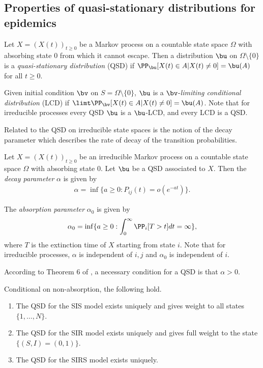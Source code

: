 \documentclass[review]{elsarticle}
\begin{document}
\subsection{Properties of quasi-stationary distributions for epidemics}\label{subsec: qsd}
\begin{mydef}
  Let $X = (X(t))_{t \geq 0}$ be a Markov process on a countable state space $\Omega$ with absorbing state $0$ from which it cannot escape. Then a distribution $\bu$ on $\Omega \setminus \{0\}$ is a \emph{quasi-stationary distribution} (QSD) if $\PP_{\bu}[X(t) \in A | X(t) \neq 0] = \bu(A)$ for all $t \geq 0$.
  
  Given initial condition $\bv$ on $S=\Omega\setminus\{0\}$, $\bu$ is a $\bv$-\emph{limiting conditional distribution} (LCD) if $\limt \PP_{\bv}[X(t) \in A | X(t) \neq 0] = \bu(A)$. Note that for irreducible processes every QSD $\bu$ is a $\bu$-LCD, and every LCD is a QSD.
\end{mydef}

Related to the QSD on irreducible state spaces is the notion of the decay parameter which describes the rate of decay of the transition probabilities.
\begin{mydef}
	Let $X=(X(t))_{t \geq 0}$ be an irreducible Markov process on a countable state space $\Omega$ with absorbing state $0$. Let $\bu$ be a QSD associated to $X$. Then the \emph{decay parameter} $\alpha$ is given by
	\begin{align*}
	\alpha = \inf \{ a \geq 0 : P_{ij}(t) = o(e^{-at}) \}.
	\end{align*}

	The \emph{absorption parameter} $\alpha_0$ is given by
	\begin{align*}
	\alpha_0 = \inf \{a \geq 0 : \int_0^\infty \PP_i[T > t] dt = \infty \},
	\end{align*}
where $T$ is the extinction time of $X$ starting from state $i$. Note that for irreducible processes, $\alpha$ is independent of $i,j$ and $\alpha_0$ is independent of $i$.
\end{mydef}
According to Theorem 6 of \cite{vanDoorn2013}, a necessary condition for a QSD is that $\alpha > 0$.
\begin{mythm}\label{qsdepidemic}
  Conditional on non-absorption, the following hold.
  \begin{enumerate}
    \item The QSD for the SIS model exists uniquely and gives weight to all states $\{1, \dots, N\}$.
    \item The QSD for the SIR model exists uniquely and gives full weight to the state $\{(S,I)=(0,1)\}$.
    \item The QSD for the SIRS model exists uniquely.
  \end{enumerate}
\end{mythm}
\end{document}
